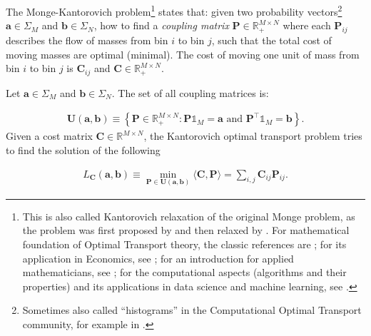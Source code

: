 

The Monge-Kantorovich problem\footnote{
  This is also called Kantorovich relaxation of the original Monge problem,
  as the problem was first proposed by \citet{monge1781} and then relaxed by \citet{kantorovich1942}.
  For mathematical foundation of Optimal Transport theory, the classic references are \citet{villani2003,villani2008};
  for its application in Economics, see \citet{galichon2016};
  for an introduction for applied mathematicians, see \citet{santambrogio2015a};
  for the computational aspects (algorithms and their properties) and its applications in data science and machine learning,
  see \citet{peyre2019}.
} states that:
given two probability vectors\footnote{
  Sometimes also called ``histograms'' in the Computational Optimal Transport community, for example in \citet{peyre2019}.
} $\mathbf{a} \in \Sigma_M$ and $\mathbf{b} \in \Sigma_N$,
how to find a \textit{coupling matrix} $\mathbf{P} \in \mathbb{R}_+^{M \times N}$
where each $\mathbf{P}_{ij}$ describes the flow of masses from bin $i$ to bin $j$,
such that the total cost of moving masses are optimal (minimal).
The cost of moving one unit of mass from bin $i$ to bin $j$ is $\mathbf{C}_{ij}$ and $\mathbf{C} \in \mathbb{R}_+^{M\times N}$.

\begin{problem}
Let $\mathbf{a} \in \Sigma_M$ and $\mathbf{b} \in \Sigma_N$.
The set of all coupling matrices is:

\begin{equation}\label{eqn-def:coupling-matrix}
  \begin{aligned}
    \mathbf{U(a,b)} \equiv \left\{
    \mathbf{P} \in \mathbb{R}_+^{M \times N}:
    \mathbf{P} \mathbb{1}_M = \mathbf{a}
    \text{ and }
    \mathbf{P}^\top \mathbb{1}_M = \mathbf{b}
    \right\}.
  \end{aligned}
\end{equation}
Given a cost matrix $\mathbf{C} \in \mathbb{R}^{M \times N}$,
the Kantorovich optimal transport problem tries to find the solution of the following

\begin{equation}\label{eqn:loss-kantorovich}
  \begin{aligned}
    L_{\mathbf{C}}(\mathbf{a}, \mathbf{b})
    \equiv \min_{\mathbf{P} \in \mathbf{U}(\mathbf{a},\mathbf{b})}
    \langle \mathbf{C}, \mathbf{P}\rangle
    = \sum_{i,j} \mathbf{C}_{ij} \mathbf{P}_{ij}.
  \end{aligned}
\end{equation}
\end{problem}

